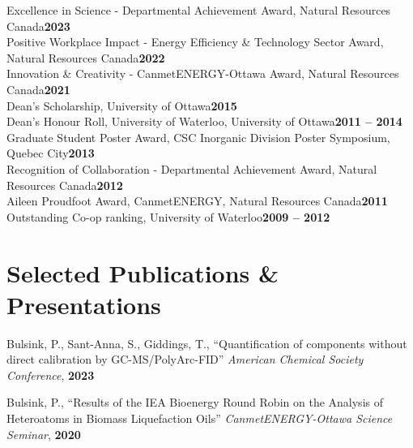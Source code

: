 \documentclass[margin,line]{resumecls}
\begin{document}
\begin{resume}
    Excellence in Science - Departmental Achievement Award,  Natural Resources Canada\hfill\textbf{2023}\vspace{1mm}\\%
    Positive Workplace Impact - Energy Efficiency \& Technology Sector Award, Natural Resources Canada\hfill\textbf{2022}\vspace{1mm}\\%
    Innovation \& Creativity - CanmetENERGY-Ottawa Award, Natural Resources Canada\hfill\textbf{2021}\vspace{1mm}\\%
    Dean's Scholarship, University of Ottawa\hfill\textbf{2015}\vspace{1mm}\\%
    Dean's Honour Roll, University of Waterloo, University of Ottawa\hfill\textbf{2011 -- 2014}\vspace{1mm}\\%
    Graduate Student Poster Award, CSC Inorganic Division Poster Symposium, Quebec City\hfill\textbf{2013}\vspace{1mm}\\%
    Recognition of Collaboration - Departmental Achievement Award, Natural Resources Canada\hfill\textbf{2012}\vspace{1mm}\\%
    Aileen Proudfoot Award, CanmetENERGY, Natural Resources Canada\hfill\textbf{2011}\vspace{1mm}\\%
    Outstanding Co-op ranking, University of Waterloo\hfill\textbf{2009 -- 2012}\vspace{1mm}%


    \section{\mysidestyle Selected Publications \& Presentations}
    Bulsink, P., Sant-Anna, S., Giddings, T., ``Quantification of components without direct calibration by GC-MS/PolyArc\textsuperscript \textregistered-FID'' \textit{American Chemical Society Conference}, \textbf{2023}

    \vspace{0mm}
    Bulsink, P., ``Results of the IEA Bioenergy Round Robin on the Analysis of Heteroatoms in Biomass Liquefaction Oils'' \textit{CanmetENERGY-Ottawa Science Seminar}, \textbf{2020}


\end{resume}
\end{document}
